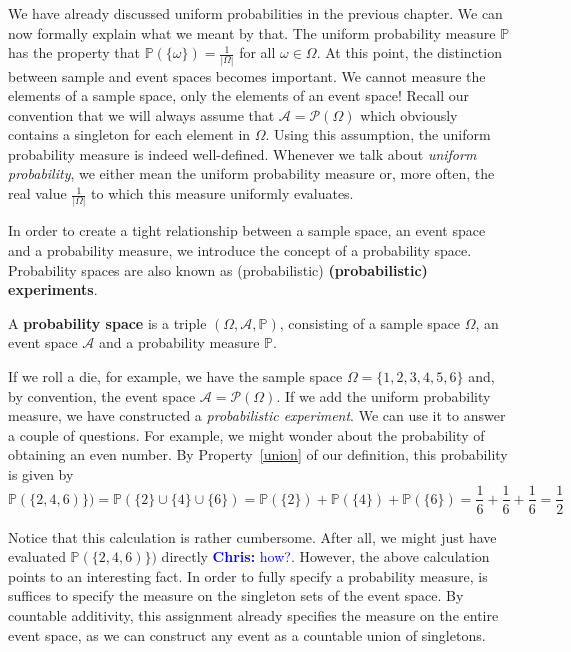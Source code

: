 \documentclass[a4paper,11pt,leqno]{report}
\newcommand{\chris}[1]{ \textcolor{blue}{\textbf{Chris:} #1}}
\begin{document}
We have already discussed uniform probabilities in the previous chapter. We can now formally explain
what we meant by that. The uniform probability measure $ \mathbb{P} $ has the property that
$ \mathbb{P}(\{\omega\}) = \frac{1}{|\Omega|} $ for all $ \omega \in \Omega $. At this point, the
distinction between sample and event spaces becomes important. We cannot measure the elements of a
sample space, only the elements of an event space! Recall our convention that we will always assume
that $ \mathcal{A} = \mathcal{P}(\Omega) $ which obviously contains a singleton for each element in
$ \Omega $. Using this assumption, the uniform probability measure is indeed well-defined. Whenever we talk about
\textit{uniform probability}, we either mean the uniform probability measure or, more often, the real
value $ \frac{1}{|\Omega|} $ to which this measure uniformly evaluates.

In order to create a tight relationship between a sample space, an event space and a probability measure,
we introduce the concept of a probability space. Probability spaces are also known as 
(probabilistic) \textbf{(probabilistic) experiments}.

\begin{Definition} \label{def:ProbabilitySpace}
A \textbf{probability space} is a triple $ (\Omega, \mathcal{A}, \mathbb{P}) $, consisting of a sample space $ \Omega $,
an event space $ \mathcal{A} $ and a probability measure $ \mathbb{P} $.
\end{Definition}

If we roll a die, for example, we have the sample space $ \Omega = \{1,2,3,4,5,6\} $ and, by 
convention, the event space $ \mathcal{A} = \mathcal{P}(\Omega) $. If we add the uniform probability measure, 
we have constructed  a \emph{probabilistic experiment}. We can use it to answer a couple of questions. For example, we 
might wonder about the probability of obtaining an even number. By Property~\ref{union} of our definition, this 
probability is given by
\begin{equation}
\mathbb{P}(\{2,4,6)\}) = \mathbb{P}(\{2\} \cup \{4\} \cup \{6\}) = \mathbb{P}(\{2
\}) + \mathbb{P}(\{4\})
+ \mathbb{P}(\{6\}) = \frac{1}{6} + \frac{1}{6} + \frac{1}{6} = \frac{1}{2}
\end{equation}

Notice that this calculation is rather cumbersome. After all, we might just have evaluated 
$ \mathbb{P}(\{2,4,6)\}) $ directly\chris{how?}. However, the above calculation points to an interesting fact. In order
to fully specify a probability measure, is suffices to specify the measure on the singleton sets of the
event space. By countable additivity, this assignment already specifies the measure on the entire event space, as we can
construct any event as a countable union of singletons.
\end{document}
